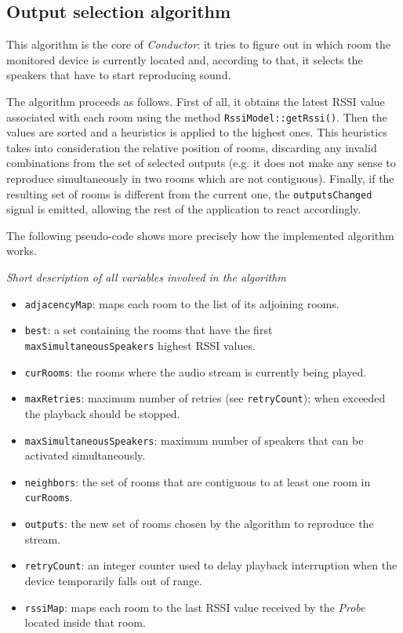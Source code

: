 \documentclass[conference]{IEEEtran}
\newcommand{\Conductor}{\textsl{Conductor}}
\newcommand{\Probe}{\textsl{Probe}}
\begin{document}
\subsection{Output selection algorithm}
This algorithm is the core of \Conductor{}: it tries to figure out in which room the monitored device is currently located and, according to that, it selects the speakers that have to start reproducing sound.

The algorithm proceeds as follows. First of all, it obtains the latest RSSI value associated with each room using the method \texttt{RssiModel::getRssi()}. Then the values are sorted and a heuristics is applied to the highest ones. This heuristics takes into consideration the relative position of rooms, discarding any invalid combinations from the set of selected outputs (e.g. it does not make any sense to reproduce simultaneously in two rooms which are not contiguous). Finally, if the resulting set of rooms is different from the current one, the \texttt{outputsChanged} signal is emitted, allowing the rest of the application to react accordingly.

The following pseudo-code shows more precisely how the implemented algorithm works.

\vspace{2mm}
\textit{Short description of all variables involved in the algorithm}
\begin{itemize}
\item \texttt{adjacencyMap}: maps each room to the list of its adjoining rooms.
\item \texttt{best}: a set containing the rooms that have the first \texttt{maxSimultaneousSpeakers} highest RSSI values.
\item \texttt{curRooms}: the rooms where the audio stream is currently being played.
\item \texttt{maxRetries}: maximum number of retries (see \texttt{retryCount}); when exceeded the playback should be stopped.
\item \texttt{maxSimultaneousSpeakers}: maximum number of speakers that can be activated simultaneously.
\item \texttt{neighbors}: the set of rooms that are contiguous to at least one room in \texttt{curRooms}.
\item \texttt{outputs}: the new set of rooms chosen by the algorithm to reproduce the stream.
\item \texttt{retryCount}: an integer counter used to delay playback interruption when the device temporarily falls out of range.
\item \texttt{rssiMap}: maps each room to the last RSSI value received by the \Probe{} located inside that room.
\end{itemize}
\end{document}
